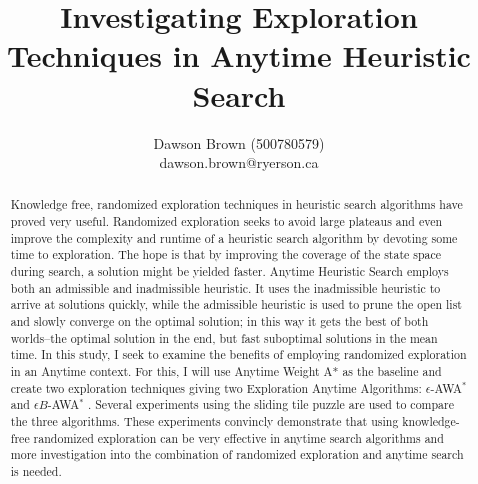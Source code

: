 \documentclass[letterpaper]{article}
\title{Investigating Exploration Techniques in Anytime Heuristic Search}
\author{Dawson Brown (500780579)\\dawson.brown@ryerson.ca}
\date{}
\newcommand{\eawa}{$\epsilon$-AWA$^*$ }
\newcommand{\ebawa}{$\epsilon B$-AWA$^*$ }
\begin{document}
\maketitle
\pagestyle{plain}

\begin{abstract}
    Knowledge free, randomized exploration techniques in heuristic search algorithms have proved very useful. Randomized exploration seeks to avoid large plateaus and even improve the complexity and runtime of a heuristic search algorithm by devoting some time to exploration. The hope is that by improving the coverage of the state space during search, a solution might be yielded faster. Anytime Heuristic Search employs both an admissible and inadmissible heuristic. It uses the inadmissible heuristic to arrive at solutions quickly, while the admissible heuristic is used to prune the open list and slowly converge on the optimal solution; in this way it gets the best of both worlds--the optimal solution in the end, but fast suboptimal solutions in the mean time. In this study, I seek to examine the benefits of employing randomized exploration in an Anytime context. For this, I will use Anytime Weight A* as the baseline and create two exploration techniques giving two Exploration Anytime Algorithms: \eawa and \ebawa. Several experiments using the sliding tile puzzle are used to compare the three algorithms. These experiments convincly demonstrate that using knowledge-free randomized exploration can be very effective in anytime search algorithms and more investigation into the combination of randomized exploration and anytime search is needed. 
\end{abstract}














\newpage

% 
\end{document}
